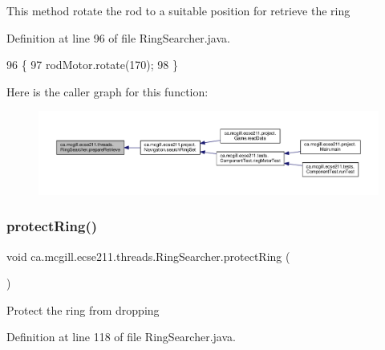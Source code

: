 This method rotate the rod to a suitable position for retrieve the ring 

Definition at line 96 of file Ring\+Searcher.\+java.


\begin{DoxyCode}
96                                 \{
97     rodMotor.rotate(170);
98   \}
\end{DoxyCode}
Here is the caller graph for this function\+:
\nopagebreak
\begin{figure}[H]
\begin{center}
\leavevmode
\includegraphics[width=350pt]{classca_1_1mcgill_1_1ecse211_1_1threads_1_1_ring_searcher_a6cbee26320e250b07e4f4b14f60d39a0_icgraph}
\end{center}
\end{figure}
\mbox{\label{classca_1_1mcgill_1_1ecse211_1_1threads_1_1_ring_searcher_a17ca33f66eca9dd1ad822f99849296ec}} 
\subsubsection{\texorpdfstring{protect\+Ring()}{protectRing()}}
{\footnotesize\ttfamily void ca.\+mcgill.\+ecse211.\+threads.\+Ring\+Searcher.\+protect\+Ring (\begin{DoxyParamCaption}{ }\end{DoxyParamCaption})}

Protect the ring from dropping 

Definition at line 118 of file Ring\+Searcher.\+java.


